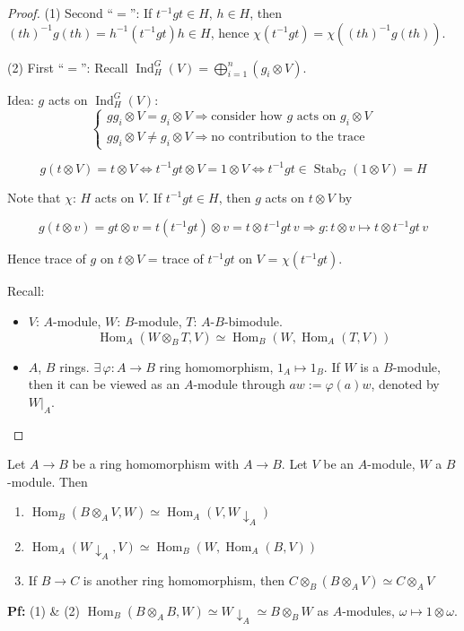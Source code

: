 \documentclass[11pt, a4paper]{report}
\begin{document}
\begin{proof}
(1) Second ``$=$'': If $t^{-1} g t \in H$, $h \in H$, then $(th)^{-1} g(th) = h^{-1}(t^{-1} g t)h \in H$, hence $\chi\left(t^{-1} g t\right) = \chi\left((th)^{-1} g(th)\right)$.

(2) First ``$=$'': Recall $\operatorname{Ind}_{H}^{G}(V) = \bigoplus_{i=1}^{n} (g_{i} \otimes V)$.

Idea: $g$ acts on $\operatorname{Ind}_{H}^{G}(V)$:
\[
\begin{cases}
g g_{i} \otimes V = g_{i} \otimes V \Rightarrow \text{consider how } g \text{ acts on } g_{i} \otimes V \\
g g_{i} \otimes V \neq g_{i} \otimes V \Rightarrow \text{no contribution to the trace}
\end{cases}
\]

\[
g(t \otimes V) = t \otimes V \Leftrightarrow t^{-1} g t \otimes V = 1 \otimes V \Leftrightarrow t^{-1} g t \in \operatorname{Stab}_{G}(1 \otimes V) = H
\]

Note that $\chi$: $H$ acts on $V$. If $t^{-1} g t \in H$, then $g$ acts on $t \otimes V$ by

\[
g(t \otimes v) = gt \otimes v = t(t^{-1} g t) \otimes v = t \otimes t^{-1} g t\, v \Rightarrow g: t \otimes v \mapsto t \otimes t^{-1} g t\, v
\]

Hence trace of $g$ on $t \otimes V$ = trace of $t^{-1} g t$ on $V$ = $\chi\left(t^{-1} g t\right)$.

Recall:
\begin{itemize}
\item $V$: $A$-module, $W$: $B$-module, $T$: $A$-$B$-bimodule.
\[
\operatorname{Hom}_{A}(W \otimes_{B} T, V) \simeq \operatorname{Hom}_{B}\left(W, \operatorname{Hom}_{A}(T, V)\right)
\]
\item $A$, $B$ rings. $\exists\, \varphi: A \rightarrow B$ ring homomorphism, $1_{A} \mapsto 1_{B}$.
If $W$ is a $B$-module, then it can be viewed as an $A$-module through $a w := \varphi(a) w$, denoted by $W|_{A}$.
\end{itemize}

\end{proof}

\begin{lemma}
Let $A \rightarrow B$ be a ring homomorphism with $A \rightarrow B$. Let $V$ be an $A$-module, $W$ a $B$-module. Then
\begin{enumerate}
\item $\operatorname{Hom}_{B}(B \otimes_{A} V, W) \simeq \operatorname{Hom}_{A}(V, W \downarrow_{A})$
\item $\operatorname{Hom}_{A}(W \downarrow_{A}, V) \simeq \operatorname{Hom}_{B}(W, \operatorname{Hom}_{A}(B, V))$
\item If $B \rightarrow C$ is another ring homomorphism, then $C \otimes_{B} (B \otimes_{A} V) \simeq C \otimes_{A} V$
\end{enumerate}
\textbf{Pf:}
(1) \& (2) $\operatorname{Hom}_{B}(B \otimes_{A} B, W) \simeq W \downarrow_{A} \simeq B \otimes_{B} W$ as $A$-modules, $\omega \mapsto 1 \otimes \omega$.

\end{lemma}
\end{document}
